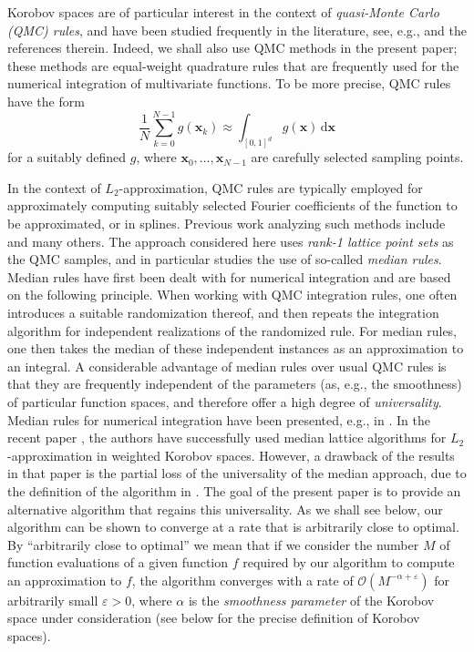 \documentclass[a4paper,11pt]{article}
\newcommand{\rd}{\, \mathrm{d}}
\newcommand{\bsx}{\boldsymbol{x}}
\begin{document}
Korobov spaces are
of particular interest in the context of \textit{quasi-Monte Carlo (QMC) rules}, and have been studied frequently in the literature, see, e.g., \cite{dick2022lattice, kuo2013high, novak2008tractability} and the references therein. Indeed, we shall also use QMC methods in the present paper; these methods are equal-weight quadrature rules that are frequently used for the numerical integration of multivariate functions. To be more precise, QMC rules have the form 
\[
\frac{1}{N}\sum_{k=0}^{N-1}g(\bsx_k) \approx \int_{[0,1]^d} g(\bsx) \rd \bsx
\]
for a suitably defined $g$, where $\bsx_0,\ldots,\bsx_{N-1}$ are carefully selected sampling points. 

In the context of 
$L_2$-approximation, QMC rules are typically employed for approximately computing suitably selected Fourier coefficients of the function to be approximated, or in splines. Previous work analyzing such methods include \cite{BGKS24,CGK24,CKNS20,kuo2006lattice,li2003trigonometric,PKG24, zeng2006error} and many others. The approach considered here uses \textit{rank-1 lattice point sets} as the QMC samples, and in particular studies the use of so-called \textit{median rules}. Median rules have first been dealt with for numerical integration and are based on the following principle. When working with QMC integration rules, one often introduces a suitable randomization thereof, and then repeats the integration algorithm for independent realizations of the randomized rule. For median rules, one then takes the median of these independent instances as an approximation to an integral. A considerable advantage of median rules over usual QMC rules is that they are frequently independent of the parameters (as, e.g., the smoothness) of particular function spaces, and therefore offer a high degree of \textit{universality}. Median rules for numerical integration have been presented, e.g., in \cite{goda2022free,goda2024universal,pan2024super-pol}. In the recent paper \cite{PKG24}, the authors have successfully used median lattice algorithms for $L_2$-approximation in weighted Korobov spaces. However, a drawback of the results in that paper is the partial loss of the universality of the median approach, due to the definition of the algorithm in \cite{PKG24}. The goal of the present paper is to provide an alternative algorithm that regains this universality. As we shall see below, our algorithm can be shown to converge at a rate that is arbitrarily close to optimal. By ``arbitrarily close to optimal'' we mean that if we consider the number $M$ of function evaluations of a given function $f$ required by our algorithm to compute an approximation to $f$, the algorithm converges with a rate of $\mathcal{O} (M^{-\alpha + \varepsilon})$ for arbitrarily small $\varepsilon>0$, where $\alpha$ is the \textit{smoothness parameter} of the Korobov space under consideration (see below for the precise definition of Korobov spaces). 
\end{document}
